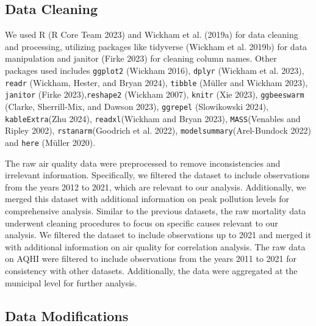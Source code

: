 \documentclass[
  letterpaper,
  DIV=11,
  numbers=noendperiod]{scrartcl}
\begin{document}
\subsection{Data Cleaning}\label{data-cleaning}

We used R (R Core Team 2023) and Wickham et al. (2019a) for data
cleaning and processing, utilizing packages like tidyverse (Wickham et
al. 2019b) for data manipulation and janitor (Firke 2023) for cleaning
column names. Other packages used includes \texttt{ggplot2} (Wickham
2016), \texttt{dplyr} (Wickham et al. 2023), \texttt{readr} (Wickham,
Hester, and Bryan 2024), \texttt{tibble} (Müller and Wickham 2023),
\texttt{janitor} (Firke 2023),\texttt{reshape2} (Wickham 2007),
\texttt{knitr} (Xie 2023), \texttt{ggbeeswarm} (Clarke, Sherrill-Mix,
and Dawson 2023), \texttt{ggrepel} (Slowikowski 2024),
\texttt{kableExtra}(Zhu 2024), \texttt{readxl}(Wickham and Bryan 2023),
\texttt{MASS}(Venables and Ripley 2002), \texttt{rstanarm}(Goodrich et
al. 2022), \texttt{modelsummary}(Arel-Bundock 2022) and \texttt{here}
(Müller 2020).

The raw air quality data were preprocessed to remove inconsistencies and
irrelevant information. Specifically, we filtered the dataset to include
observations from the years 2012 to 2021, which are relevant to our
analysis. Additionally, we merged this dataset with additional
information on peak pollution levels for comprehensive analysis. Similar
to the previous datasets, the raw mortality data underwent cleaning
procedures to focus on specific causes relevant to our analysis. We
filtered the dataset to include observations up to 2021 and merged it
with additional information on air quality for correlation analysis. The
raw data on AQHI were filtered to include observations from the years
2011 to 2021 for consistency with other datasets. Additionally, the data
were aggregated at the municipal level for further analysis.

\subsection{Data Modifications}\label{data-modifications}
\end{document}
